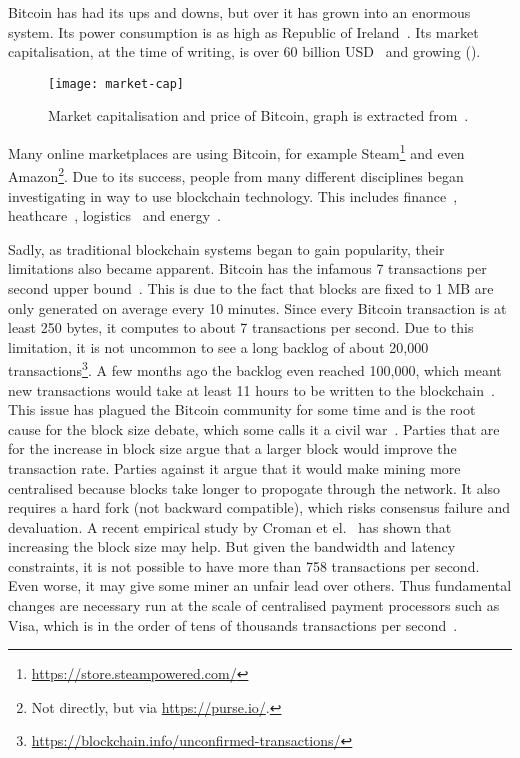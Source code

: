 Bitcoin has had its ups and downs, but over it has grown into an enormous system.
Its power consumption is as high as Republic of Ireland~\cite{o2014bitcoin}.
Its market capitalisation, at the time of writing, is over 60 billion USD~\cite{bitcoinmarketcap} and growing ().
\begin{figure}[h]
\centering
\texttt{[image: market-cap]}
\caption{Market capitalisation and price of Bitcoin, graph is extracted from~\cite{bitcoinmarketcap}.}
\label{fig:market-cap}
\end{figure}
Many online marketplaces are using Bitcoin, for example Steam\footnote{\url{https://store.steampowered.com/}} and even Amazon\footnote{Not directly, but via \url{https://purse.io/}.}.
Due to its success, people from many different disciplines began investigating in way to use blockchain technology.
This includes finance~\cite{finance}, heathcare~\cite{healthcare}, logistics~\cite{supplychain} and energy~\cite{energy}.

Sadly, as traditional blockchain systems began to gain popularity,
their limitations also became apparent.
Bitcoin has the infamous 7 transactions per second upper bound~\cite{vukolic2015quest}.
This is due to the fact that blocks are fixed to 1 MB are only generated on average every 10 minutes.
Since every Bitcoin transaction is at least 250 bytes, it computes to about 7 transactions per second.
Due to this limitation, it is not uncommon to see a long backlog of about 20,000 transactions\footnote{\url{https://blockchain.info/unconfirmed-transactions/}}.
A few months ago the backlog even reached 100,000, which meant new transactions would take at least 11 hours to be written to the blockchain~\cite{bitcoinbacklog}.
This issue has plagued the Bitcoin community for some time and is the root cause for the block size debate, which some calls it a civil war~\cite{bitcoincivilwar}.
Parties that are for the increase in block size argue that a larger block would improve the transaction rate.
Parties against it argue that it would make mining more centralised because blocks take longer to propogate through the network.
It also requires a hard fork (not backward compatible), which risks consensus failure and devaluation.
A recent empirical study by Croman et el.~\cite{croman2016scaling} has shown that increasing the block size may help.
But given the bandwidth and latency constraints,
it is not possible to have more than 758 transactions per second.
Even worse, it may give some miner an unfair lead over others.
Thus fundamental changes are necessary run at the scale of centralised payment processors such as Visa,
which is in the order of tens of thousands transactions per second~\cite{visa}.

